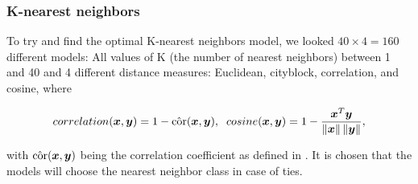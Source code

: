 

\subsubsection{K-nearest neighbors}
To try and find the optimal K-nearest neighbors model, we looked $40 \times 4 = 160$ different models: All values of K (the number of nearest neighbors) between 1 and 40 and 4 different distance measures: Euclidean, cityblock, correlation, and cosine, where

\vspace{-0.1cm}
\begin{equation}
correlation(\bm{x},\bm{y}) = 1 - \hat{\text{cor}}(\bm{x},\bm{y}),\;\;
cosine(\bm{x},\bm{y}) = 1 - \frac{\bm{x}^T\bm{y}}{\left\lVert\bm{x}\right\rVert\left\lVert\bm{y}\right\rVert},
\end{equation}
\vspace{-0.1cm}

with $\hat{\text{cor}}(\bm{x},\bm{y})$ being the correlation coefficient as defined in \cite[eq. 4.7]{ coursenotes}. It is chosen that the models will choose the nearest neighbor class in case of ties.

